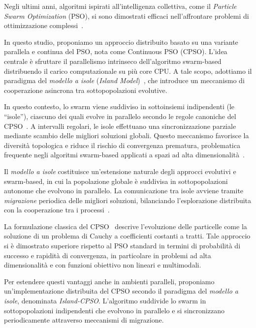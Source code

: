 \documentclass{article}
\begin{document}
Negli ultimi anni, algoritmi ispirati all’intelligenza collettiva, come il \textit{Particle Swarm Optimization} 
(PSO), si sono dimostrati efficaci nell'affrontare problemi di ottimizzazione complessi~\cite{kennedy1995particle, 
eberhart2001pso}. 

In questo studio, proponiamo un approccio distribuito basato su una variante parallela e 
continua del PSO, nota come Continuous PSO (CPSO). L’idea centrale è sfruttare il parallelismo 
intrinseco dell’algoritmo swarm-based distribuendo il carico computazionale su più core CPU. A tale 
scopo, adottiamo il paradigma del \textit{modello a isole} (\textit{Island Model})~\cite{cantupaz1998survey, 
tomassini2005spatially}, che introduce un meccanismo di cooperazione asincrona tra sottopopolazioni 
evolutive.

In questo contesto, lo swarm viene suddiviso in sottoinsiemi indipendenti (le “isole”), ciascuno dei 
quali evolve in parallelo secondo le regole canoniche del CPSO~\cite{Ricciardello2020}. A intervalli 
regolari, le isole effettuano una sincronizzazione parziale mediante scambio delle migliori soluzioni 
globali. Questo meccanismo favorisce la diversità topologica e riduce il rischio di convergenza prematura, 
problematica frequente negli algoritmi swarm-based applicati a spazi ad alta dimensionalità~\cite{omran2005dynamic}.

Il \textit{modello a isole} costituisce un’estensione naturale degli approcci evolutivi e swarm-based, in cui 
la popolazione globale è suddivisa in sottopopolazioni autonome che evolvono in parallelo. La comunicazione 
tra isole avviene tramite \textit{migrazione} periodica delle migliori soluzioni, bilanciando l'esplorazione 
distribuita con la cooperazione tra i processi~\cite{tomassini2005spatially, cantupaz1998survey}.

La formulazione classica del CPSO~\cite{Ricciardello2020} descrive l’evoluzione delle particelle come la 
soluzione di un problema di Cauchy a coefficienti costanti a tratti. Tale approccio si è dimostrato 
superiore rispetto al PSO standard in termini di probabilità di successo e rapidità di convergenza, in 
particolare in problemi ad alta dimensionalità e con funzioni obiettivo non lineari e multimodali.

Per estendere questi vantaggi anche in ambienti paralleli, proponiamo un’implementazione distribuita del 
CPSO secondo il paradigma del \textit{modello a isole}, denominata \textit{Island-CPSO}. L’algoritmo 
suddivide lo swarm in sottopopolazioni indipendenti che evolvono in parallelo e si sincronizzano 
periodicamente attraverso meccanismi di migrazione.
\end{document}
